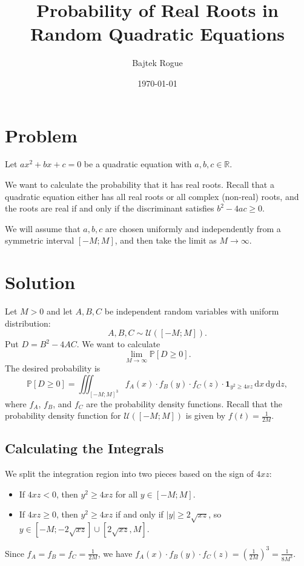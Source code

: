 \documentclass[a4paper,12pt]{report}
\title{Probability of Real Roots in Random Quadratic Equations}
\author{Bajtek Rogue}
\date{\today}
\begin{document}
\maketitle

\section*{Problem}

Let $ax^2+bx+c=0$ be a quadratic equation with $a,b,c\in\mathbb{R}$. 

We want to calculate the probability that it has real roots. Recall that a quadratic equation either has all real roots or all complex (non-real) roots, and the roots are real if and only if the discriminant satisfies $b^2-4ac\ge0$.

We will assume that $a,b,c$ are chosen uniformly and independently from a symmetric interval $[-M;M]$, and then take the limit as $M\to\infty$.

\section*{Solution}

Let $M>0$ and let $A,B,C$ be independent random variables with uniform distribution:
\[
A,B,C\sim\mathcal{U}([-M;M]).
\]
Put $D=B^2-4AC$. We want to calculate
\[
\lim_{M\to\infty} \mathbb{P}[D\ge0].
\]
The desired probability is
\[
\mathbb{P}[D\ge0]=\iiint_{[-M;M]^3}f_A(x)\cdot f_B(y) \cdot f_C(z)\cdot \mathbf{1}_{y^2\ge4xz}\,\mathrm{d}x\,\mathrm{d}y\,\mathrm{d}z,
\]
where $f_A$, $f_B$, and $f_C$ are the probability density functions. Recall that the probability density function for $\mathcal{U}([-M;M])$ is given by $f(t)=\frac{1}{2M}$.

\subsection*{Calculating the Integrals}

We split the integration region into two pieces based on the sign of $4xz$:
\begin{itemize}
    \item If $4xz<0$, then $y^2\ge 4xz$ for all $y\in[-M;M]$.
    \item If $4xz\ge 0$, then $y^2\ge 4xz$ if and only if $|y|\ge 2\sqrt{xz}$, so \\ $y\in [-M;-2\sqrt{xz}]\cup[2\sqrt{xz},M]$.
\end{itemize}

Since $f_A=f_B=f_C=\frac{1}{2M}$, we have $f_A(x)\cdot f_B(y)\cdot f_C(z)=\left(\frac{1}{2M}\right)^3=\frac{1}{8M^3}$.
\end{document}
